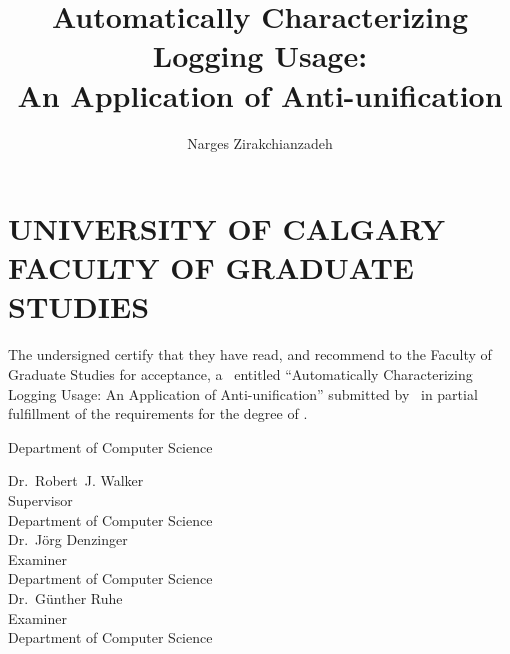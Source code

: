 \documentclass{ucalgthes1}
\title{Automatically Characterizing Logging Usage:\\An Application of Anti-unification}
\author{Narges Zirakchianzadeh}
\theoremstyle{plain}
\theoremstyle{definition}
\newcommand{\thestitle}{Automatically Characterizing Logging Usage: An Application of Anti-unification}
\begin{document}
\makethesistitle
{}     %
\setcounter{page}{1}


\chapter*{UNIVERSITY OF CALGARY \\ FACULTY OF GRADUATE STUDIES}
\thispagestyle{empty}
The undersigned certify that they have read, and recommend
to the Faculty of Graduate Studies for acceptance, a \Thesis\ entitled
``\thestitle'' submitted by \Author\
in partial fulfillment of the requirements for the degree of
\Degree.\\

%
%

\begin{signing}{Department of Computer Science}

\newsigncolumn

\signline
Dr.~Robert~J. Walker \\
Supervisor \\
Department of Computer Science  \\


\signline
Dr.~J{\"o}rg Denzinger \\
Examiner \\
Department of  Computer Science \\

\signline
Dr.~G\"{u}nther Ruhe\\
Examiner \\
Department of  Computer Science \\
\end{signing}
\end{document}
